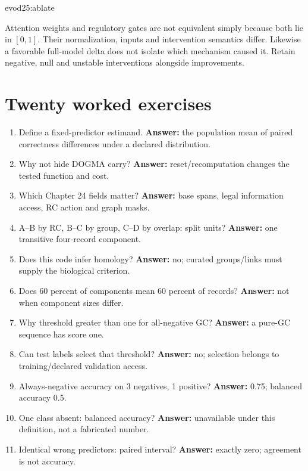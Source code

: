 {evod25:ablate}

Attention weights and regulatory gates are not equivalent simply because
both lie in $[0,1]$. Their normalization, inputs and intervention semantics
differ. Likewise a favorable full-model delta does not isolate which
mechanism caused it. Retain negative, null and unstable interventions
alongside improvements.

\section{Twenty worked exercises}
\begin{enumerate}
\item Define a fixed-predictor estimand. \textbf{Answer:}
the population mean of paired correctness differences under a declared distribution.
\item Why not hide DOGMA carry? \textbf{Answer:} reset/recomputation changes
the tested function and cost.
\item Which Chapter 24 fields matter? \textbf{Answer:} base spans, legal
information access, RC action and graph masks.
\item A--B by RC, B--C by group, C--D by overlap: split units?
\textbf{Answer:} one transitive four-record component.
\item Does this code infer homology? \textbf{Answer:} no; curated groups/links
must supply the biological criterion.
\item Does 60 percent of components mean 60 percent of records?
\textbf{Answer:} not when component sizes differ.
\item Why threshold greater than one for all-negative GC?
\textbf{Answer:} a pure-GC sequence has score one.
\item Can test labels select that threshold? \textbf{Answer:} no;
selection belongs to training/declared validation access.
\item Always-negative accuracy on 3 negatives, 1 positive?
\textbf{Answer:} 0.75; balanced accuracy 0.5.
\item One class absent: balanced accuracy? \textbf{Answer:}
unavailable under this definition, not a fabricated number.
\item Identical wrong predictors: paired interval? \textbf{Answer:}
exactly zero; agreement is not accuracy.

\end{enumerate}
